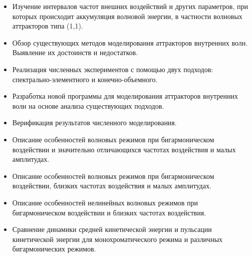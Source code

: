 \begin{itemize}

  \item Изучение интервалов частот внешних воздействий и других параметров, при которых происходит аккумуляция волновой энергии, в частности волновых аттракторов типа (1,1). 

    
  \item Обзор существующих методов моделирования аттракторов внутренних волн. Выявление их достоинств и недостатков.
    
  \item Реализация численных экспериментов с помощью двух подходов: спектрально-элементного и конечно-объемного.

  \item Разработка новой программы для моделирования аттракторов внутренних волн на основе анализа существующих подходов.
    
  \item Верификация результатов численного моделирования.

  \item Описание особенностей волновых режимов при бигармоническом воздействии и значительно отличающихся частотах воздействия и малых амплитудах.

  \item Описание особенностей волновых режимов при бигармоническом воздействии, близких частотах воздействия и малых амплитудах.
    
  \item Описание особенностей нелинейных волновых режимов при бигармоническом воздействии и близких частотах воздействия.

  \item Сравнение динамики средней кинетической энергии и пульсации кинетической энергии для монохроматического режима и различных бигармонических режимов.
    
    
    
    
\end{itemize}

